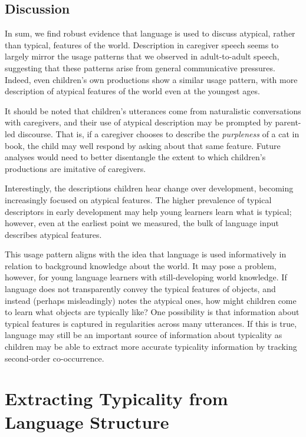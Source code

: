\documentclass[10pt, letterpaper]{article}
\begin{document}
\hypertarget{discussion}{%
\subsection{Discussion}\label{discussion}}

In sum, we find robust evidence that language is used to discuss
atypical, rather than typical, features of the world. Description in
caregiver speech seems to largely mirror the usage patterns that we
observed in adult-to-adult speech, suggesting that these patterns arise
from general communicative pressures. Indeed, even children's own
productions show a similar usage pattern, with more description of
atypical features of the world even at the youngest ages.

It should be noted that children's utterances come from naturalistic
conversations with caregivers, and their use of atypical description may
be prompted by parent-led discourse. That is, if a caregiver chooses to
describe the \emph{purpleness} of a cat in book, the child may well
respond by asking about that same feature. Future analyses would need to
better disentangle the extent to which children's productions are
imitative of caregivers.

Interestingly, the descriptions children hear change over development,
becoming increasingly focused on atypical features. The higher
prevalence of typical descriptors in early development may help young
learners learn what is typical; however, even at the earliest point we
measured, the bulk of language input describes atypical features.

This usage pattern aligns with the idea that language is used
informatively in relation to background knowledge about the world. It
may pose a problem, however, for young language learners with
still-developing world knowledge. If language does not transparently
convey the typical features of objects, and instead (perhaps
misleadingly) notes the atypical ones, how might children come to learn
what objects are typically like? One possibility is that information
about typical features is captured in regularities across many
utterances. If this is true, language may still be an important source
of information about typicality as children may be able to extract more
accurate typicality information by tracking second-order co-occurrence.

\hypertarget{extracting-typicality-from-language-structure}{%
\section{Extracting Typicality from Language
Structure}\label{extracting-typicality-from-language-structure}}
\end{document}
